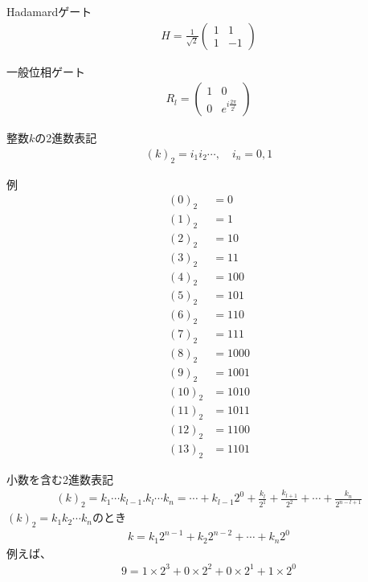 \documentclass[]{ltjsarticle}
\begin{document}
Hadamardゲート
\begin{align}
    H 
    = 
    \frac{1}{\sqrt{2}}
    \begin{pmatrix}
        1 & 1 \\
        1 & -1
    \end{pmatrix}
\end{align}

一般位相ゲート
\begin{align}
    R_l
    =
    \begin{pmatrix}
        1 & 0 \\
        0 & e^{i\frac{2\pi}{2^l}}
    \end{pmatrix}
\end{align}

整数$k$の2進数表記
\begin{align}
    (k)_2 = i_1 i_2 \cdots, \quad i_n = 0, 1
\end{align}

例
\begin{align}
    (0)_2 &= 0 \\
    (1)_2 &= 1 \\
    (2)_2 &= 10 \\
    (3)_2 &= 11 \\
    (4)_2 &= 100 \\
    (5)_2 &= 101 \\
    (6)_2 &= 110 \\
    (7)_2 &= 111 \\
    (8)_2 &= 1000 \\
    (9)_2 &= 1001 \\
    (10)_2 &= 1010 \\
    (11)_2 &= 1011 \\
    (12)_2 &= 1100 \\
    (13)_2 &= 1101
\end{align}

小数を含む2進数表記
\begin{align}
    (k)_2 
    =
    k_1 \cdots k_{l-1}. k_l \cdots k_n
    =
    \cdots + k_{l-1} 2^{0}
    +
    \frac{k_l}{2^1}
    +
    \frac{k_{l+1}}{2^2}
    +
    \cdots
    +
    \frac{k_n}{2^{n-l+1}}
\end{align}
$(k)_2 = k_1 k_2 \cdots k_n$のとき
\begin{align}
    k 
    = 
    k_1 2^{n-1}
    +
    k_2 2^{n-2}
    +
    \cdots
    +
    k_n 2^0
\end{align}
例えば、
\begin{align}
    9 
    = 
    1 \times 2^{3}
    +
    0 \times 2^{2}
    +
    0 \times 2^{1}
    +
    1 \times 2^0
\end{align}
\end{document}
